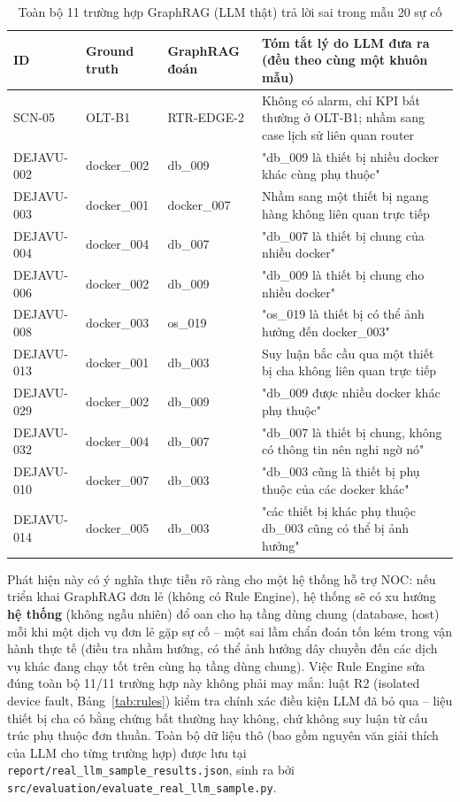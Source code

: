 \documentclass[12pt,a4paper]{report}
\newcommand{\code}[1]{\texttt{\small #1}}
\begin{document}
\begin{table}[H]
\centering
\small
\caption{Toàn bộ 11 trường hợp GraphRAG (LLM thật) trả lời sai trong mẫu 20 sự cố}
\label{tab:error-cases}
\begin{tabular}{@{}p{1.7cm}p{1.7cm}p{1.7cm}p{7.0cm}@{}}
\toprule
ID & Ground truth & GraphRAG đoán & Tóm tắt lý do LLM đưa ra (đều theo cùng một khuôn mẫu) \\
\midrule
SCN-05 & OLT-B1 & RTR-EDGE-2 & Không có alarm, chỉ KPI bất thường ở OLT-B1; nhầm sang case lịch sử liên quan router \\
DEJAVU-002 & docker\_002 & db\_009 & "db\_009 là thiết bị nhiều docker khác cùng phụ thuộc" \\
DEJAVU-003 & docker\_001 & docker\_007 & Nhầm sang một thiết bị ngang hàng không liên quan trực tiếp \\
DEJAVU-004 & docker\_004 & db\_007 & "db\_007 là thiết bị chung của nhiều docker" \\
DEJAVU-006 & docker\_002 & db\_009 & "db\_009 là thiết bị chung cho nhiều docker" \\
DEJAVU-008 & docker\_003 & os\_019 & "os\_019 là thiết bị có thể ảnh hưởng đến docker\_003" \\
DEJAVU-013 & docker\_001 & db\_003 & Suy luận bắc cầu qua một thiết bị cha không liên quan trực tiếp \\
DEJAVU-029 & docker\_002 & db\_009 & "db\_009 được nhiều docker khác phụ thuộc" \\
DEJAVU-032 & docker\_004 & db\_007 & "db\_007 là thiết bị chung, không có thông tin nên nghi ngờ nó" \\
DEJAVU-010 & docker\_007 & db\_003 & "db\_003 cũng là thiết bị phụ thuộc của các docker khác" \\
DEJAVU-014 & docker\_005 & db\_003 & "các thiết bị khác phụ thuộc db\_003 cũng có thể bị ảnh hưởng" \\
\bottomrule
\end{tabular}
\end{table}

Phát hiện này có ý nghĩa thực tiễn rõ ràng cho một hệ thống hỗ trợ NOC: nếu triển khai GraphRAG đơn
lẻ (không có Rule Engine), hệ thống sẽ có xu hướng \textbf{hệ thống} (không ngẫu nhiên) đổ oan cho
hạ tầng dùng chung (database, host) mỗi khi một dịch vụ đơn lẻ gặp sự cố -- một sai lầm chẩn đoán
tốn kém trong vận hành thực tế (điều tra nhầm hướng, có thể ảnh hưởng dây chuyền đến các dịch vụ
khác đang chạy tốt trên cùng hạ tầng dùng chung). Việc Rule Engine sửa đúng toàn bộ 11/11 trường hợp
này không phải may mắn: luật R2 (isolated device fault, Bảng~\ref{tab:rules}) kiểm tra chính xác
điều kiện LLM đã bỏ qua -- liệu thiết bị cha có bằng chứng bất thường hay không, chứ không suy luận
từ cấu trúc phụ thuộc đơn thuần. Toàn bộ dữ liệu thô (bao gồm nguyên văn giải thích của LLM cho từng
trường hợp) được lưu tại \code{report/real\_llm\_sample\_results.json}, sinh ra bởi
\code{src/evaluation/evaluate\_real\_llm\_sample.py}.
\end{document}
